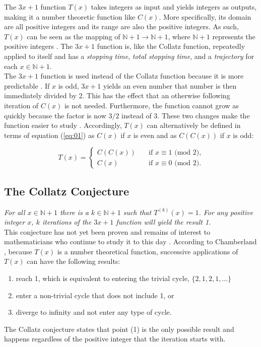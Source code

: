 \documentclass[12pt,a4paper,reqno]{amsart}
\begin{document}
The $3x+1$ function $T(x)$ 
takes integers as input and yields integers as outputs, making it a number
theoretic function like $C(x)$. More specifically, its
domain are all positive integers and its range are also the positive integers.
As such, $T(x)$ can be seen as the mapping of 
$\mathbb{N} + 1 \rightarrow \mathbb{N} + 1$, where $\mathbb{N} + 1$ represents
the positive integers \cite{src:04}. The $3x+1$ 
function is, like the Collatz function, repeatedly applied to itself and has 
a \textit{stopping time}, \textit{total stopping time}, and a 
\textit{trajectory} for each $x \in \mathbb{N} + 1$. \\
The $3x+1$ function is used instead of the Collatz function because it is more 
predictable \cite{src:03}. 
If $x$ is odd, $3x+1$ yields an even number that number is then 
immediately divided by 2. This has the effect that an otherwise following
iteration of $C(x)$ is not needed. Furthermore, the function cannot grow as
quickly because the factor is now $3/2$ instead of 3. These two changes make
the function easier to study \cite{src:03}.
Accordingly, $T(x)$ can alternatively be defined in terms of equation 
(\ref{eq:01}) as $C(x)$ if $x$ is even and as $C(C(x))$ if $x$ is odd:

\begin{equation}
T(x)= \left\{
\nonumber
    \begin{array}{ll}
        C(C(x))\quad &\text{if } x \equiv 1 \text{ (mod 2),} \\
        C(x) \quad &\text{if } x \equiv 0 \text{ (mod 2).}
    \end{array}
\right.
\label{eq:03}
\end{equation}

\subsection{The Collatz Conjecture}

\textit{For all $x \in \mathbb{N} + 1$ there is a $k \in \mathbb{N} + 1$ such 
that $T^{(k)}(x)=1$. For any positive integer $x$, $k$ iterations of the $3x+1$ 
function will yield the result 1.} \\
This conjecture has not yet been proven and remains of interest to
mathematicians who continue to study it to this day \cite{src:03}. According to 
Chamberland \cite{src:02}, because $T(x)$ is a number theoretical function, 
successive applications of $T(x)$ can have the following results:
\begin{enumerate}
    \item reach 1, which is equivalent to entering the trivial cycle,
        $\{2,1,2,1,\dots\}$
    \item enter a non-trivial cycle that does not include 1, or
    \item diverge to infinity and not enter any type of cycle.
\end{enumerate}
The Collatz conjecture states that point (1) is the only possible result and 
happens regardless of the positive integer that the iteration starts with.
\end{document}
